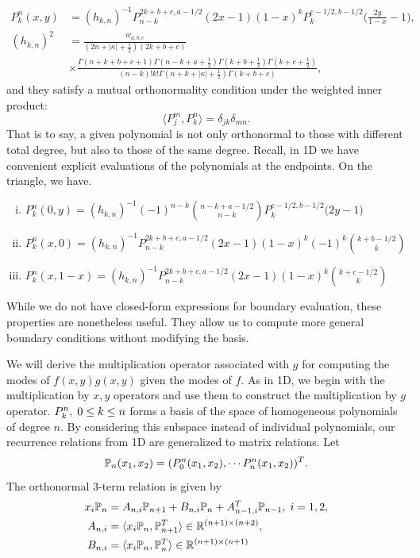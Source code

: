 \begin{equation}\label{eq:koornwinder}
\begin{split}
	P_k^n(x,y) &= (h_{k,n})^{-1}P_{n-k}^{2k+b+c,a-1/2}(2x-1)(1-x)^kP_k^{c-1/2,b-1/2}\Big(\frac{2y}{1-x}-1\Big),\\
	(h_{k,n})^2 &= \frac{w_{a,b,c}}{(2n+|\kappa|+\frac{1}{2})(2k+b+c)} \\
	          &\times \frac{\Gamma(n+k+b+c+1)\Gamma(n-k+a+\frac{1}{2})\Gamma(k+b+\frac{1}{2})\Gamma(k+c+\frac{1}{2})}{(n-k)!k!\Gamma(n+k+|\kappa|+\frac{1}{2})\Gamma(k+b+c)},
\end{split}
\end{equation}
and they satisfy a mutual orthonormality condition under the weighted inner product:
\begin{equation}\label{eq:koornorth}
	\langle P_j^m,P_k^n\rangle = \delta_{jk}\delta_{mn}. 
\end{equation}
That is to say, a given polynomial is not only orthonormal to those with different total degree, but also to those of the same degree. Recall, in 1D we have convenient explicit evaluations of the polynomials at the endpoints. On the triangle, we have. 
\begin{enumerate}[(i)]
\item $P_k^n(0,y) = (h_{k,n})^{-1}(-1)^{n-k}{n-k+a-1/2 \choose n-k}P_k^{c-1/2,b-1/2}\Big(2y-1\Big)$
\item $P_k^n(x,0) = (h_{k,n})^{-1}P_{n-k}^{2k+b+c,a-1/2}(2x-1)(1-x)^k(-1)^k{k+b-1/2\choose k}$
\item $P_k^n(x,1-x) = (h_{k,n})^{-1}P_{n-k}^{2k+b+c,a-1/2}(2x-1)(1-x)^k{k+c-1/2\choose k}$
\end{enumerate}
While we do not have closed-form expressions for boundary evaluation, these properties are nonetheless useful. They allow us to compute more general boundary conditions without modifying the basis.

We will derive the multiplication operator associated with $g$ for computing the modes of $f(x,y)g(x,y)$ given the modes of $f$. As in 1D, we begin with the multiplication by $x,y$ operators and use them to construct the multiplication by $g$ operator.
$P_k^n,\;0\leq k\leq n$ forms a basis of the space of homogeneous polynomials of degree $n$. By considering this subspace instead of individual polynomials, our recurrence relations from 1D are generalized to matrix relations. Let $$\mathbb{P}_n(x_1,x_2) = (P_0^n(x_1,x_2),\cdots P_n^n(x_1,x_2))^T.$$ The orthonormal 3-term relation is given by 
\begin{align}
	x_i\mathbb{P}_n &= A_{n,i}\mathbb{P}_{n+1} + B_{n,i}\mathbb{P}_n + A_{n-1,i}^T\mathbb{P}_{n-1},\; i = 1,2,\label{eq:recur2D}\\
	A_{n,i} &= \langle x_i \mathbb{P}_n,\mathbb{P}_{n+1}^T\rangle \in \mathbb{R}^{(n+1)\times(n+2)},\label{eq:recur2D1}\\
	B_{n,i} &= \langle x_i \mathbb{P}_n,\mathbb{P}_n^T \rangle \in \mathbb{R}^{(n+1)\times(n+1)}\label{eq:recur2D2}
\end{align}

